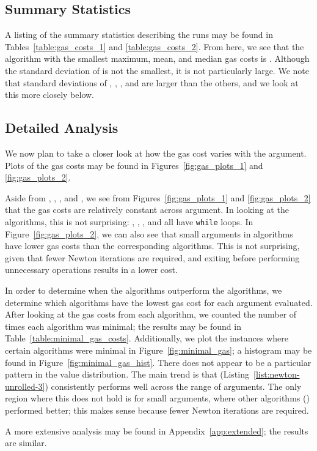 \subsection{Summary Statistics}

A listing of the summary statistics describing the runs
may be found in Tables~\ref{table:gas_costs_1}
and \ref{table:gas_costs_2}.
From here, we see that the algorithm with the smallest
maximum, mean, and median gas costs is \UnrolledThree{}.
Although the standard deviation of \UnrolledThree{} is not the smallest,
it is not particularly large.
We note that standard deviations of
\Uniswap{}, \WhileOne{}, \WhileTwo{}, and \WhileThree{}
are larger than the others, and we look at this more closely below.

\subsection{Detailed Analysis}

We now plan to take a closer look at how the gas cost varies
with the argument.
Plots of the gas costs may be found in Figures~\ref{fig:gas_plots_1}
and \ref{fig:gas_plots_2}.

Aside from \Uniswap{}, \WhileOne{}, \WhileTwo{}, and \WhileThree{},
we see from Figures~\ref{fig:gas_plots_1} and \ref{fig:gas_plots_2}
that the gas costs are relatively constant across argument.
In looking at the algorithms, this is not surprising:
\Uniswap{}, \WhileOne{}, \WhileTwo{}, and \WhileThree{}
all have \texttt{while} loops.
In Figure~\ref{fig:gas_plots_2},
we can also see that small arguments in \While{} algorithms
have lower gas costs than the corresponding \Unrolled{} algorithms.
This is not surprising, given that fewer Newton iterations are required,
and exiting before performing unnecessary operations results in a lower cost.

In order to determine when the \Unrolled{} algorithms outperform
the \While{} algorithms,
we determine which algorithms
have the lowest gas cost for each argument evaluated.
After looking at the gas costs from each algorithm,
we counted the number of times each algorithm was minimal;
the results may be found in Table~\ref{table:minimal_gas_costs}.
Additionally, we plot the instances where certain algorithms
were minimal in Figure~\ref{fig:minimal_gas};
a histogram may be found in Figure~\ref{fig:minimal_gas_hist}.
There does not appear to be a particular pattern
in the value distribution.
The main trend is that
\UnrolledThree{} (Listing~\ref{list:newton-unrolled-3})
consistently performs well across the range of arguments.
The only region where this does not hold is for small arguments,
where other algorithms (\While{}) performed better;
this makes sense because fewer Newton iterations are required.

A more extensive analysis may be found in
Appendix~\ref{app:extended};
the results are similar.








